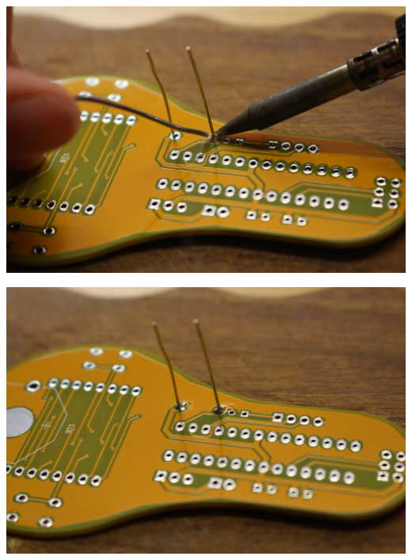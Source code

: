 \documentclass{article}
\begin{document}
\begin{minipage}[b]{0.5\textwidth}
	\includegraphics[width=\textwidth]{Bilder/IMG_5542.JPG}
\end{minipage}
\begin{minipage}[b]{0.5\textwidth}
	\includegraphics[width=\textwidth]{Bilder/IMG_5543.JPG}
\end{minipage}

\vspace{0.5cm}
\end{document}
